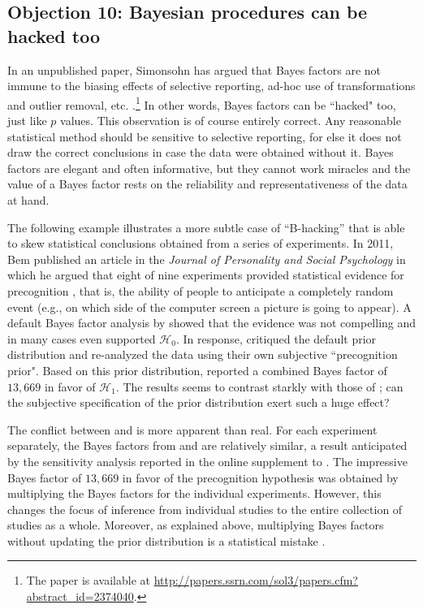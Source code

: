 \subsection{Objection 10: Bayesian procedures can be hacked too}
In an unpublished paper, Simonsohn has argued that Bayes factors are not immune to the biasing effects of selective reporting, ad-hoc use of transformations and outlier removal, etc. \cite{SimonsohnBayeshacking}.\footnote{The paper is available at \url{http://papers.ssrn.com/sol3/papers.cfm?abstract_id=2374040}.} In other words, Bayes factors can be ``hacked" too, just like $p$ values. This observation is of course entirely correct. Any reasonable statistical method should be sensitive to selective reporting, for else it does not draw the correct conclusions in case the data were obtained without it. Bayes factors are elegant and often informative, but they cannot work miracles and the value of a Bayes factor rests on the reliability and representativeness of the data at hand.

The following example illustrates a more subtle case of ``B-hacking'' that is able to skew statistical conclusions obtained from a series of experiments. In 2011, Bem published an article in the \emph{Journal of Personality and Social Psychology} in which he argued that eight of nine experiments provided statistical evidence for precognition \cite{Bem2011}, that is, the ability of people to anticipate a completely random event (e.g., on which side of the computer screen a picture is going to appear). A default Bayes factor analysis by  showed that the evidence was not compelling and in many cases even supported $\mathcal{H}_0$. In response,  critiqued the default prior distribution and re-analyzed the data using their own subjective ``precognition prior". Based on this prior distribution,  reported a combined Bayes factor of $13,669$ in favor of $\mathcal{H}_1$. The results seems to contrast starkly with those of ; can the subjective specification of the prior distribution exert such a huge effect?

The conflict between  and  is more apparent than real. For each experiment separately, the Bayes factors from  and  are relatively similar, a result anticipated by the sensitivity analysis reported in the online supplement to . The impressive Bayes factor of $13,669$ in favor of the precognition hypothesis was obtained by multiplying the Bayes factors for the individual experiments. However, this changes the focus of inference from individual studies to the entire collection of studies as a whole. Moreover, as explained above, multiplying Bayes factors without updating the prior distribution is a statistical mistake \cite{Jeffreys1961,RouderMorey2011,WagenmakersEtAl2016Bathing}.

